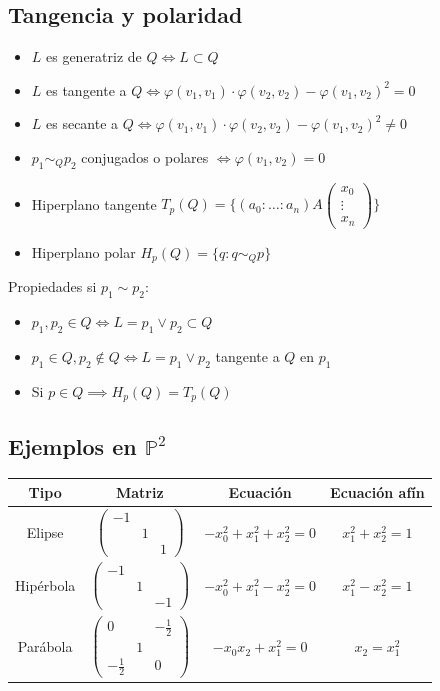 \documentclass{myclass}
\renewcommand{\P}{\mathbb{P}}
\begin{document}
\subsection{Tangencia y polaridad}
\begin{itemize}
  \item $L$ es generatriz de  $Q \iff L\subset Q$
  \item $L$ es tangente a  $Q \iff \varphi(v_1, v_1)\cdot \varphi(v_2,v_2)-\varphi (v_1, v_2)^2=0 $
  \item $L$ es secante a  $Q \iff \varphi(v_1, v_1)\cdot \varphi(v_2,v_2)-\varphi (v_1, v_2)^2\neq 0 $
  \item $p_1\sim_Q p_2$ conjugados o polares $\iff \varphi (v_1, v_2)=0$
  \item Hiperplano tangente $T_p(Q) = \{(a_0:\ldots:a_n)A\begin{pmatrix} x_0\\ \vdots\\ x_n \end{pmatrix} \}$
  \item Hiperplano polar $H_p(Q)=\{q : q\sim_Q p\}$
\end{itemize}
Propiedades si $p_1\sim p_2$:
\begin{itemize}
  \item $p_1, p_2 \in Q \iff L=p_1\lor p_2 \subset Q$
  \item $p_1\in Q, p_2\not\in Q \iff L=p_1 \lor p_2$ tangente a $Q$ en $p_1$
  \item Si $p\in Q \implies H_p(Q) = T_p(Q)$
\end{itemize}

\subsection{Ejemplos en $\P^2$}
\begin{center}
\begin{tabular}{|c|c|c|c|}
\hline
Tipo & Matriz & Ecuación & Ecuación afín \\
\hline
Elipse & $\begin{pmatrix} -1 & & \\ & 1 & \\ & & 1 \end{pmatrix}$ & $-x_0^2 + x_1^2 + x_2^2=0$ & $x_1^2+x_2^2=1$\\
\hline
Hipérbola & $\begin{pmatrix} -1 & & \\ & 1 & \\ & & -1 \end{pmatrix}$ & $-x_0^2 + x_1^2 - x_2^2=0$ & $x_1^2-x_2^2=1$\\
\hline
Parábola & $\begin{pmatrix} 0 & & -\frac{1}{2}  \\  & 1 & \\ -\frac{1}{2} & & 0 \end{pmatrix}$ & $-x_0x_2 + x_1^2 =0$ & $x_2=x_1^2$\\
\hline

\end{tabular}
\end{center}
\end{document}

